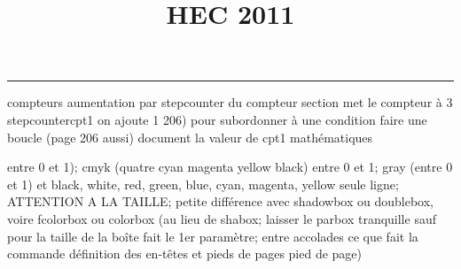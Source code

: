 \documentclass[11pt]{article}%
\title{\bf \vspace{-1cm} HEC 2011} %
\author{} %
\date{} %
\renewcommand{\headrulewidth}{0pt}%
\renewcommand{\footrulewidth}{0.4pt}%
\begin{document}
\maketitle %
\vspace{-1.2cm}\hrule %
\thispagestyle{fancy}

\vspace*{.4cm}


compteurs%
aumentation par stepcounter du compteur section%
met le compteur à 3%
stepcounter{cpt1} on ajoute 1%
206) pour subordonner à une condition %
faire une boucle (page 206 aussi) %
document la valeur de cpt1 
mathématiques\newcommand{\ch}{\operatorname{ch}} 
\newcommand{\sh}{\operatorname{sh}}
\renewcommand{\tanh}{\operatorname{th}}
\renewcommand{\sinh}{\operatorname{sh}}
\renewcommand{\cosh}{\operatorname{ch}}
\newcommand{\argsh}{\operatorname{argsh}}
\newcommand{\argch}{\operatorname{argch}}
\newcommand{\argth}{\operatorname{argth}}
\newcommand{\Id}{\operatorname{Id}}
\renewcommand{\leq}{\leq}
\renewcommand{\geq}{\geq }

\newcommand{\dlim}{\lim}
\newcommand{\dsum}{\sum}
\newcommand{\dprod}{\prod}



entre 0 et 1); cmyk (quatre cyan magenta yellow black) entre 0 et 1;
gray (entre 0 et 1) et black, white, red, green, blue, cyan, magenta,
yellow%
seule ligne; ATTENTION A LA TAILLE; petite différence avec shadowbox ou
doublebox, voire fcolorbox ou colorbox (au lieu de shabox; laisser le
parbox tranquille sauf pour la taille de la boîte
\newcommand{\Tbox}[1]{\begin{center} \shabox{\parbox{0.6
\linewidth}{#1}} \end{center}} %
fait le 1er paramètre; entre accolades ce que fait la commande
définition des en-têtes et pieds de pages\pagestyle{fancy}
\chead{}
\rfoot[ \ \thepage]{\thepage}
\cfoot{}
\lfoot{}
\thispagestyle{fancy} %
pied de page)\renewcommand{\footrulewidth}{0.4pt}
\renewcommand{\headrulewidth}{0.4pt}
\end{document}
